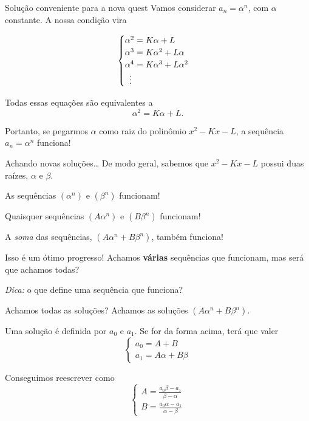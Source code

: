 \documentclass[aspectratio=169, handout]{beamer}
\begin{document}
\begin{frame}{Solução conveniente para a nova quest}
	Vamos considerar $a_n = \alpha^n$, com $\alpha$ constante. \pause A nossa condição vira
	
	\[
		\begin{cases}
			\alpha^2 = K \alpha + L \\
			\alpha^3 = K \alpha^2 + L \alpha \\
			\alpha^4 = K \alpha^3 + L \alpha^2 \\
			\hspace{.5em} \vdots
		\end{cases}
	\]

	\pause Todas essas equações são equivalentes a \[
		\alpha^2 = K \alpha + L.
	\]

	\pause Portanto, se pegarmos $\alpha$ como raiz do polinômio $x^2 - Kx - L$, a sequência $a_n = \alpha^n$ funciona!
\end{frame}

\begin{frame}{Achando novas soluções\dots}
	De modo geral, sabemos que $x^2 - Kx - L$ possui duas raízes, $\alpha$ e  $\beta$.

	\vspace{.5em}
	As sequências $\left(\alpha^n\right)$ e  $\left(\beta^n\right)$ funcionam!

	\vspace{.5em}
	\pause Quaisquer sequências $\left(A\alpha^n\right)$ e  $\left(B\beta^n\right)$ funcionam!

	\vspace{.5em}
	\pause A \emph{soma} das sequências, $\left(A\alpha^n + B\beta^n\right)$, também funciona!

	\vspace{.5em}
	\pause Isso é um ótimo progresso! \pause Achamos \textbf{várias} sequências que funcionam, mas será que achamos todas?

	\vspace{1em}
	\pause \emph{Dica:} o que define uma sequência que funciona?
\end{frame}

\begin{frame}{Achamos todas as soluções?}
	Achamos as soluções $\left(A\alpha^n + B\beta^n\right)$.

	\pause Uma solução é definida por $a_0$ e $a_1$. Se for da forma acima, terá que valer \[
		\begin{cases}
			a_0 = A + B\\
			a_1 = A\alpha + B\beta
		\end{cases}
	\]

	\pause Conseguimos reescrever como \[
		\begin{cases}
			A = \frac{a_0 \beta - a_1}{\beta - \alpha}\\
			B = \frac{a_0 \alpha - a_1}{\alpha - \beta}
		\end{cases}
	\]
\end{frame}
\end{document}
